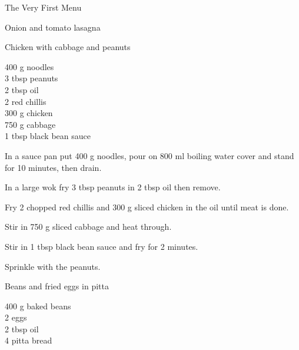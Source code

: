 \begin{menu}{The Very First Menu}
\begin{recipe}{2}{Onion and tomato lasagna}
\begin{instructions}
    \end{instructions}
    \end{recipe}%
  
    \begin{recipe}{2}{Chicken with cabbage and peanuts}%
    
		\begin{ingredients}
		400 g noodles  \\
	3 tbsp peanuts  \\
	2 tbsp oil  \\
	2  red chillis  \\
	300 g chicken  \\
	750 g cabbage  \\
	1 tbsp black bean sauce  \\
	
		\end{ingredients}
	
    \begin{instructions}
    \item 
      In a sauce pan
      put
      400 g  noodles,
      pour on
      800 ml  boiling water
      cover and stand for 10 minutes, then drain.
    \item 
        In a large wok	fry
        3 tbsp  peanuts
        in
        2 tbsp  oil
        then remove.
      \item 
        Fry 2  chopped red chillis
        and
        300 g sliced chicken
        in the oil until meat is done.
      \item 
        Stir in
        750 g sliced cabbage
        and heat through.
      \item 
        Stir in
        1 tbsp  black bean sauce
        and fry for 2 minutes.
      \item 
        Sprinkle with the peanuts.
      
    \end{instructions}
    \end{recipe}%
  
    \begin{recipe}{1}{Beans and fried eggs in pitta}%
    
		\begin{ingredients}
		400 g baked beans  \\
	2  eggs  \\
	2 tbsp oil  \\
	4  pitta bread  \\
	
		\end{ingredients}
	

\end{recipe}
\end{menu}
